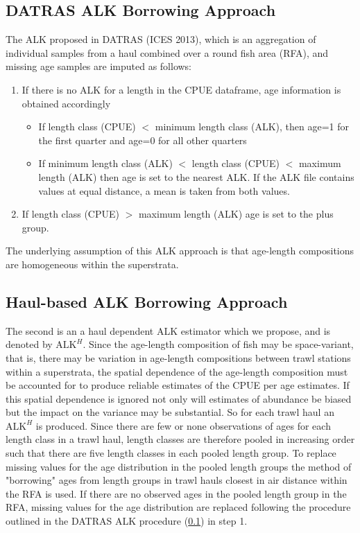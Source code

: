 \documentclass[a4paper 12pt]{article}
\numberwithin{equation}{section}
\begin{document}
\begin{appendices}
\subsection{\normalsize DATRAS ALK Borrowing Approach}
\label{secAp:DATRASBorrow}
The ALK proposed in DATRAS (ICES 2013), which is an aggregation of individual samples from a haul combined over a round fish area (RFA), and missing age samples are imputed as follows: 
\begin{enumerate}
\item If there is no ALK for a length in the CPUE dataframe, age information is obtained accordingly
\begin{itemize}
\item If length class (CPUE) $<$ minimum length class (ALK), then age=1 for the first quarter and age=0 for all other quarters
\item  If minimum length class (ALK) $<$ length class (CPUE) $<$ maximum length (ALK) then age is set to the nearest ALK. If the ALK file contains values at equal distance, a mean is taken from both values. 
\end{itemize}
\item If length class (CPUE) $>$ maximum length (ALK) age is set to the plus group.
\end{enumerate}
The underlying assumption of this ALK approach is that age-length compositions are homogeneous within the superstrata. 
\subsection{\normalsize Haul-based ALK Borrowing Approach}
\label{secAp:oursBorrow}
\indent  The second is an a haul dependent ALK estimator which we propose, and is denoted by $\mathrm{ALK}^{H}$. Since the age-length composition of fish may be space-variant, that is, there may be variation in age-length compositions between trawl stations within a superstrata, the spatial dependence of the age-length composition must be accounted for to produce reliable estimates of the CPUE per age estimates. If this spatial dependence is ignored not only will estimates of abundance be biased but the impact on the variance may be substantial. So for each trawl haul an $\mathrm{ALK}^{H}$ is produced. Since there are few or none observations of ages for each length class in a trawl haul, length classes are therefore pooled in increasing order such that there are five length classes in each pooled length group. To replace missing values for the age distribution in the pooled length groups the method of "borrowing" ages from length groups in trawl hauls closest in air distance within the RFA is used. If there are no observed ages in the pooled length group in the RFA, missing values for the age distribution are replaced following the procedure outlined in the DATRAS ALK procedure (\ref{secAp:DATRASBorrow}) in step 1.  

\end{appendices}
\end{document}
